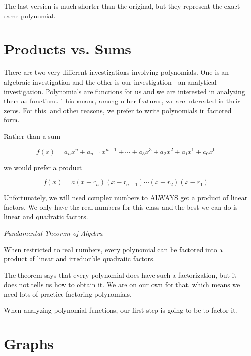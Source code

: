 \documentclass{ximera}
\begin{document}
The last version is much shorter than the original, but they represent the exact same polynomial. \\








\section{Products vs. Sums}


There are two very different investigations involving polynomials.  One is an algebraic investigation and the other is our investigation - an analytical investigation.  Polynomials are functions for us and we are interested in analyzing them as functions.  This means, among other features, we are interested in their zeros.  For this, and other reasons, we prefer to write polynomials in factored form.



Rather than a sum

\[   f(x) = a_n x^n + a_{n-1} x^{n-1} + \cdots + a_3 x^3 + a_2 x^2 + a_1 x^1 + a_0 x^0      \]

we would prefer a product

\[   f(x) = a (x-r_n)(x-r_{n-1})  \cdots (x-r_2)(x-r_1)  \]





Unfortunately, we will need complex numbers to ALWAYS get a product of linear factors.  We only have the real numbers for this class and the best we can do is linear and quadratic factors.



\begin{theorem} \textit{Fundamental Theorem of Algebra}

When restricted to real numbers, every polynomial can be factored into a product of linear and irreducible quadratic factors.

\end{theorem}


The theorem says that every polynomial does have such a factorization, but it does not tells us how to obtain it.  We are on our own for that, which means we need lots of practice factoring polynomials.

When analyzing polynomial functions, our first step is going to be to factor it.





\section {Graphs}
\end{document}
